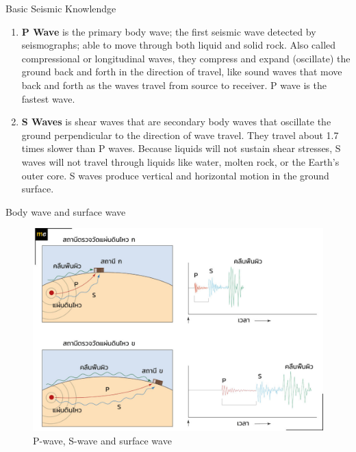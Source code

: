 \documentclass{beamer}
\newcounter{saveenumi}
\newcommand{\seti}{\setcounter{saveenumi}{\value{enumi}}}
\newcommand{\conti}{\setcounter{enumi}{\value{saveenumi}}}
\begin{document}
	\begin{frame}[t]{Basic Seismic Knowlendge}
		\begin{enumerate}
			\conti
			\item \textbf{P Wave} is the primary body wave; the first seismic wave detected by 
			seismographs; able to move through both liquid and solid rock. Also called compressional or 
			longitudinal waves, they compress and expand (oscillate) the ground back and forth in the 
			direction of travel, like sound waves that move back and forth as the waves travel from source 
			to receiver. P wave is the fastest wave.
			
			\item \textbf{S Waves} is shear waves that are secondary body waves that oscillate the ground 
			perpendicular to the direction of wave travel. They travel about 1.7 times slower than P waves. 
			Because liquids will not sustain shear stresses, S waves will not travel through liquids like water, 
			molten rock, or the Earth’s outer core. S waves produce vertical and horizontal motion in the 
			ground surface. 
			\seti
		\end{enumerate}
	\end{frame}
	
	\begin{frame}[t]{Body wave and surface wave}
		\begin{figure}
			\centering
			\includegraphics[scale=0.8]{station.jpg}
			\caption{P-wave, S-wave and surface wave}
		\end{figure}
	\end{frame}
	
\end{document}
